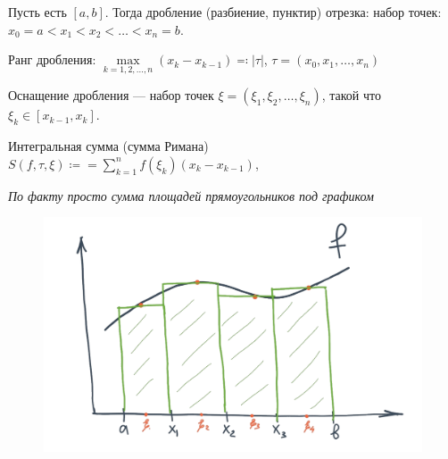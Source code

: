 \begin{definition}
    Пусть есть $[a, b]$. Тогда дробление (разбиение, пунктир) отрезка: набор точек:  $x_0 = a < x_1 < x_2 < \ldots < x_n = b$.
\end{definition}
\begin{definition}
    Ранг дробления: $\max\limits_{k=1,2,\ldots, n}(x_k - x_{k-1}) \eqqcolon |\tau|$, $\tau = (x_0, x_1, \ldots, x_n)$
\end{definition}

\begin{definition}
    Оснащение дробления --- набор точек $\xi = ( \xi_1, \xi_2, \ldots, \xi_n)$, такой что $\xi_k \in [x_{k-1}, x_k]$.
\end{definition}
\begin{definition}
    Интегральная сумма (сумма Римана) $S(f, \tau, \xi) \coloneqq = \sum\limits_{k=1}^n f(\xi_k)(x_k - x_{k-1})$, 

    \textit{По факту просто сумма площадей прямоугольников под графиком}
    \begin{figure}[h!]
    	\includegraphics[scale=0.2]{riemann_sum}
    \end{figure}
\end{definition}
